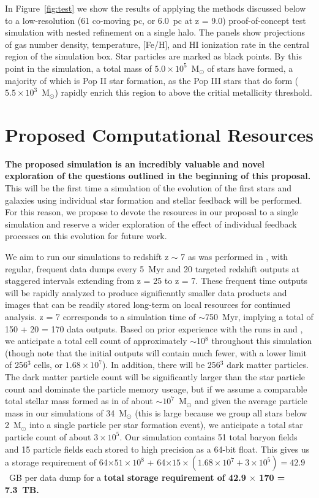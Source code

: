 \documentclass[12pt]{article} %
\begin{document}
In Figure~\ref{fig:test} we show the results of applying the methods discussed below to a low-resolution (61 co-moving pc, or 6.0~pc at z = 9.0) proof-of-concept test simulation with nested refinement on a single halo. The panels show projections of gas number density, temperature, [Fe/H], and HI ionization rate in the central region of the simulation box. Star particles are marked as black points. By this point in the simulation, a total mass  of $5.0 \times 10^{5}$~M$_{\odot}$ of stars have formed, a majority of which is Pop II star formation, as the Pop III stars that do form ($5.5 \times 10^{3}$~M$_{\odot}$) rapidly enrich this region to above the critial metallicity threshold.


\section{Proposed Computational Resources}

\textbf{The proposed simulation is an incredibly valuable and novel exploration of the questions outlined in the beginning of this proposal.} This will be the first time a simulation of the evolution of the first stars and galaxies using individual star formation and stellar feedback will be performed. For this reason, we propose to devote the resources in our proposal to a single simulation and reserve a wider exploration of the effect of individual feedback processes on this evolution for future work. 

We aim to run our simulations to redshift z $\sim$ 7 as was performed in \cite{Wise2012a}, with regular, frequent data dumps every 5~Myr and 20 targeted redshift outputs at staggered intervals extending from z = 25 to z = 7. These frequent time outputs will be rapidly analyzed to produce significantly smaller data products and images that can be readily stored long-term on local resources for continued analysis. z = 7 corresponds to a simulation time of $\sim$750~Myr, implying a total of 150 + 20 = 170 data outputs. Based on prior experience with the runs in \cite{Wise2012a} and \cite{Emerick2019a}, we anticipate a total cell count of approximately $\sim$10$^{8}$ throughout this simulation (though note that the initial outputs will contain much fewer, with a lower limit of 256$^3$ cells, or $1.68\times10^{7}$). In addition, there will be 256$^3$ dark matter particles. The dark matter particle count will be significantly larger than the star particle count and dominate the particle memory useage, but if we assume a comparable total stellar mass formed as in \cite{Wise2012a} of about $\sim 10^{7}$~M$_{\odot}$ and given the average particle mass in our simulations of 34~M$_{\odot}$ (this is large because we group all stars below 2~M$_{\odot}$ into a single particle per star formation event), we anticipate a total star particle count of about $3 \times 10^{5}$. Our simulation contains 51 total baryon fields and 15 particle fields each stored to high precision as a 64-bit float. This gives us a storage requirement of 64$\times 51 \times 10^8$ + 64$\times 15 \times (1.68\times10^7 + 3\times10^5) = 42.9$~GB per data dump for a \textbf{total storage requirement of 42.9 $\times$ 170 = 7.3~TB.}
\end{document}
